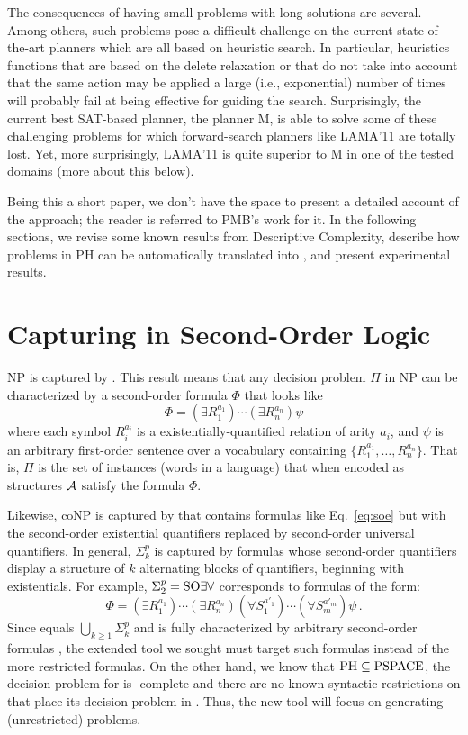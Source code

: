 The consequences of having small problems with long solutions
are several. Among others, such problems pose a difficult
challenge on the current state-of-the-art planners which are
all based on heuristic search. In particular, heuristics functions
that are based on the delete relaxation or that do not take into
account that the same action may be applied a large (i.e., exponential)
number of times will probably fail at being effective for guiding
the search.
Surprisingly, the current best SAT-based planner, the planner M,
is able to solve some of these challenging
\STRIPS problems for which forward-search planners like LAMA'11
are totally lost. Yet, more surprisingly, LAMA'11 is quite
superior to M in one of the tested domains (more about this below).

Being this a short paper, we don't have the space to present
a detailed account of the approach; the reader is referred
to PMB's work for it.
In the following sections, we revise some known results from
Descriptive Complexity, describe how problems in PH can be
automatically translated into \STRIPS, and present experimental
results.


\section{Capturing \PH in Second-Order Logic}

NP is captured by \SOE \cite{fagin:spectra}.
This result means that any decision problem $\Pi$ in NP can be
characterized by a second-order formula $\Phi$ that looks like
\begin{equation}
\label{eq:soe}
\Phi = (\exists R_1^{a_1})\cdots(\exists R_n^{a_n})\psi
\end{equation}
where each symbol $R_i^{a_i}$ is a existentially-quantified relation
of arity $a_i$, and $\psi$ is an arbitrary first-order sentence 
over a vocabulary containing $\{R_1^{a_1},\ldots,R_n^{a_n}\}$.
That is, $\Pi$ is the set of instances (words in a language)
that when encoded as structures $\mathcal{A}$ satisfy the formula $\Phi$.

Likewise, coNP is captured by \SOA that contains formulas
like Eq.~\eqref{eq:soe} but with the second-order existential
quantifiers replaced by second-order universal quantifiers.
In general, $\Sigma^p_k$ is captured by formulas
whose second-order quantifiers display a structure of $k$
alternating blocks of quantifiers, beginning with existentials.
For example, $\Sigma^p_2=\text{SO}\exists\forall$ corresponds to formulas of
the form:
\begin{equation}
\Phi = (\exists R_1^{a_1}) \cdots (\exists R_n^{a_n}) 
       (\forall S_1^{a'_1}) \cdots (\forall S_m^{a'_m})
       \psi \,.
\end{equation}
Since \PH equals $\bigcup_{k\geq 1}\Sigma^p_k$ and is
fully characterized by arbitrary second-order formulas \cite{immerman:book},
the extended tool we sought must target such formulas
instead of the more restricted \SOE formulas.
On the other hand, we know that $\text{PH}\subseteq\text{PSPACE}$, the
decision problem for \STRIPS is \PSPACE-complete and there
are no known syntactic restrictions on \STRIPS that place
its decision problem in \PH. Thus, the new tool will focus
on generating (unrestricted) \STRIPS problems.

